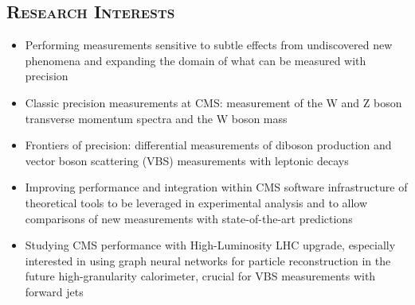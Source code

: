 \documentclass[10pt]{res} %
\begin{document}
\begin{resume}
\section{\textsc{Research Interests}}
\begin{itemize}
    \item Performing measurements sensitive to subtle effects from undiscovered new phenomena
        and expanding the domain of what can be measured with precision
    \item Classic precision measurements at CMS: measurement of the W and Z boson transverse momentum spectra and the W boson mass 
    \item Frontiers of precision: differential measurements of diboson production 
        and vector boson scattering (VBS) measurements with leptonic decays
    \item Improving performance and integration within CMS software infrastructure of theoretical tools 
        to be leveraged in experimental analysis and to allow comparisons of new measurements with state-of-the-art predictions
    \item Studying CMS performance with High-Luminosity LHC upgrade, especially interested in using graph neural networks 
        for particle reconstruction in the future high-granularity calorimeter, crucial for VBS measurements with forward jets 
\end{itemize}


\end{resume}
\end{document}
